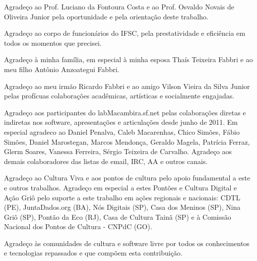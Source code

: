 

Agradeço ao Prof. Luciano da Fontoura Costa e ao Prof. Osvaldo Novais de Oliveira Junior pela oportunidade e pela orientação deste trabalho.

\vspace{4 mm}

Agradeço ao corpo de funcionários do IFSC, pela prestatividade e eficiência em todos os momentos que precisei.

\vspace{4 mm}

Agradeço à minha família, em especial à minha esposa Thaís Teixeira Fabbri e ao meu filho Antônio Anzoategui Fabbri.

\vspace{4 mm}

Agradeço ao meu irmão Ricardo Fabbri e ao amigo Vilson Vieira da Silva Junior pelas profícuas colaborações acadêmicas, artísticas e socialmente engajadas.


\vspace{4 mm}

Agradeço aos participantes do labMacambira.sf.net pelas colaborações diretas e indiretas nos software, apresentações e articulações desde junho de 2011. Em especial agradeco ao Daniel Penalva, Caleb Macarenhas, Chico Simões, Fábio Simões, Daniel Marostegan, Marcos Mendonça, Geraldo Magela, Patrícia Ferraz, Glerm Soares, Vanessa Ferreira, Sérgio Teixeira de Carvalho. Agradeço aos demais colaboradores das listas de email, IRC, AA e outros canais.


\vspace{4 mm}

Agradeço ao Cultura Viva e aos pontos de cultura pelo apoio fundamental a este e outros trabalhos. Agradeço em especial a estes Pontões e Cultura Digital e Ação Griô pelo suporte a este trabalho em ações regionais e nacionais: CDTL (PE), JuntaDados.org (BA), Nós Digitais (SP), Casa dos Meninos (SP), Nina Griô (SP), Pontão da Eco (RJ), Casa de Cultura Tainã (SP) e à Comissão Nacional dos Pontos de Cultura - CNPdC (GO).


\vspace{4 mm}

Agradeço às comunidades de cultura e software livre por todos os conhecimentos e tecnologias repassados e que compõem esta contribuição. 

